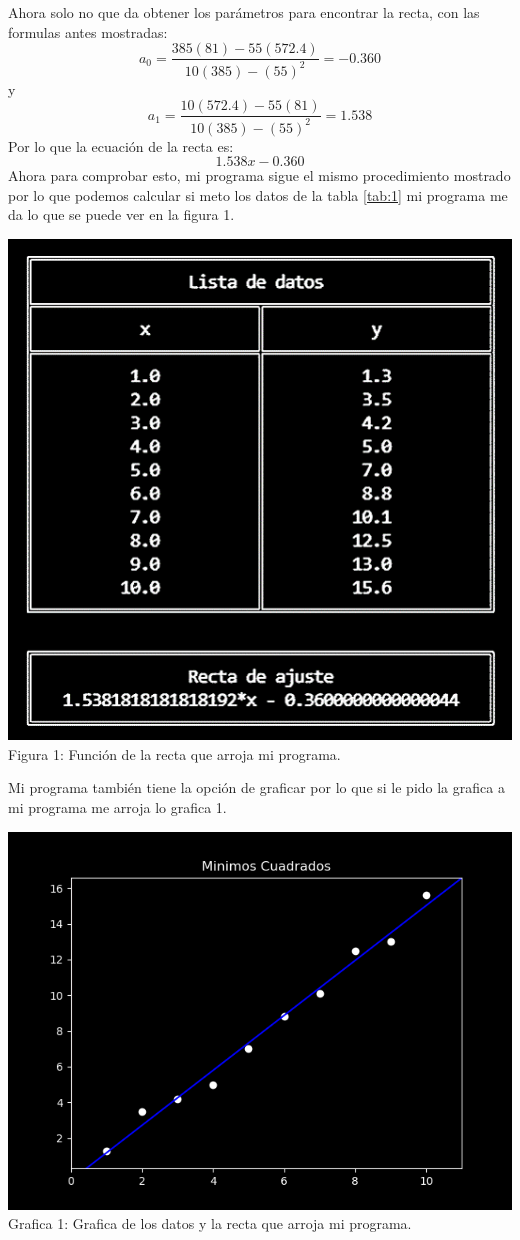 \documentclass[12pt]{article}
\begin{document}
			Ahora solo no que da obtener los parámetros para encontrar la recta, con las formulas antes mostradas:
			$$ a_0 = \frac{385(81) - 55(572.4)}{10(385) - (55)^2} = -0.360 $$
			y
			$$ a_1 = \frac{10(572.4) - 55(81)}{10(385) - (55)^2} = 1.538 $$
			Por lo que la ecuación de la recta es:
			$$ 1.538x - 0.360 $$
			Ahora para comprobar esto, mi programa sigue el mismo procedimiento mostrado por lo que podemos calcular 
			si meto los datos de la tabla \ref{tab:1} mi programa me da lo que se puede ver en la figura 1.
			\begin{center}
				\includegraphics[width=.5\linewidth]{Figura 1.png}\\
				Figura 1: Función de la recta que arroja mi programa.
				\label{Fig:1}
			\end{center}
			Mi programa también tiene la opción de graficar por lo que si le pido la grafica a mi programa me arroja 
			lo grafica 1.
			\begin{center}
				\includegraphics[width=.85\linewidth]{Grafica 1.png}\\
				Grafica 1: Grafica de los datos y la recta que arroja mi programa.
			\end{center}
\end{document}
